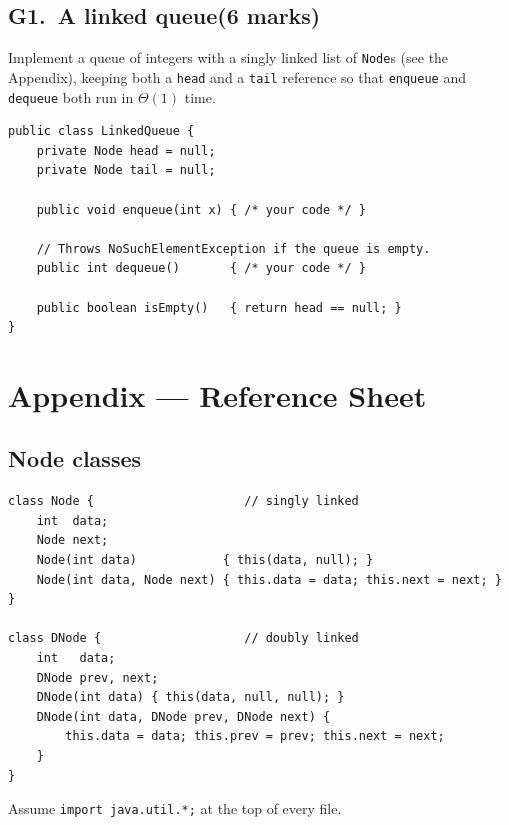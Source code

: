 \documentclass[11pt]{article}
\newcommand{\code}[1]{\mbox{\texttt{#1}}}  %
\newcommand{\score}[1]{{\unskip\nobreak\hfil\penalty50
  \hskip2em\hbox{}\nobreak\hfil\mbox{[\hspace{2.5em}/\,#1\,]}%
  \parfillskip=0pt \finalhyphendemerits=0 \par}}
\newcommand{\question}[4][8\baselineskip]{\needspace{#1}%
  \subsection*{#2.\ #3\hfill{\normalsize\normalfont(#4 marks)}}}
\begin{document}
\question{G1}{A linked queue}{6}
Implement a queue of integers with a singly linked list of \code{Node}s (see
the Appendix), keeping both a \code{head} and a \code{tail} reference so
that \code{enqueue} and \code{dequeue} both run in $\Theta(1)$ time.
\begin{lstlisting}
public class LinkedQueue {
    private Node head = null;
    private Node tail = null;

    public void enqueue(int x) { /* your code */ }

    // Throws NoSuchElementException if the queue is empty.
    public int dequeue()       { /* your code */ }

    public boolean isEmpty()   { return head == null; }
}
\end{lstlisting}

\clearpage
\section*{Appendix --- Reference Sheet}

\subsection*{Node classes}
\begin{lstlisting}
class Node {                     // singly linked
    int  data;
    Node next;
    Node(int data)            { this(data, null); }
    Node(int data, Node next) { this.data = data; this.next = next; }
}

class DNode {                    // doubly linked
    int   data;
    DNode prev, next;
    DNode(int data) { this(data, null, null); }
    DNode(int data, DNode prev, DNode next) {
        this.data = data; this.prev = prev; this.next = next;
    }
}
\end{lstlisting}
Assume \code{import java.util.*;} at the top of every file.
\end{document}
